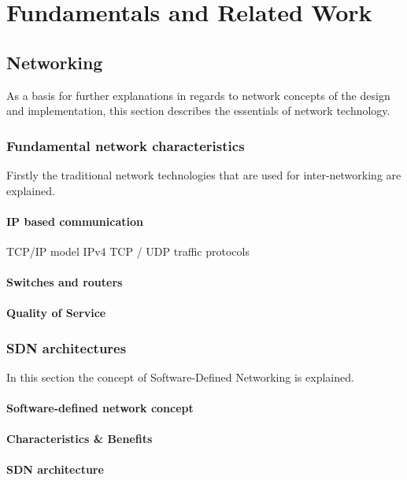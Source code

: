 \chapter{Fundamentals and Related Work}

\section{Networking}

As a basis for further explanations in regards to network concepts of the design and implementation, this section describes the essentials of network technology.

\subsection{Fundamental network characteristics }

Firstly the traditional network technologies that are used for inter-networking are explained.

\subsubsection{IP based communication}
TCP/IP model
IPv4
TCP / UDP traffic
protocols

\subsubsection{Switches and routers}

\subsubsection{Quality of Service}

\subsection{SDN architectures}

In this section the concept of Software-Defined Networking is explained.

\subsubsection{Software-defined network concept}

\textbf{Characteristics \& Benefits}

\subsubsection{SDN architecture}

